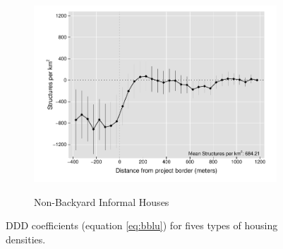 \documentclass[12pt]{article}
\begin{document}
\begin{figure}[t!]
\begin{subfigure}[b]{0.49\textwidth}
        \label{fig:DDDbackyard}
    \end{subfigure}
    \vskip 1mm \vskip 0pt
    \begin{subfigure}[b]{.49\textwidth}  
        \centering
        \caption[]{\small Non-Backyard Informal Houses} 
        \vspace{-1mm}
        \includegraphics[width=\textwidth,trim={.5cm .3cm .3cm 0cm}, clip=true]{figures/distplotDDD_bblu_inf_non_backyard_admin}    
        \label{fig:DDDnonbackyard}
    \end{subfigure}
    \hfill \hspace{.02\textwidth}
    \begin{minipage}{0.47\textwidth}   
    \vspace{-6cm}
    \caption[]
    {\small DDD coefficients (equation \ref{eq:bblu}) for fives types of housing densities.} \label{fig:DDDbblu}
	\end{minipage}
\end{figure} 
\end{document}
